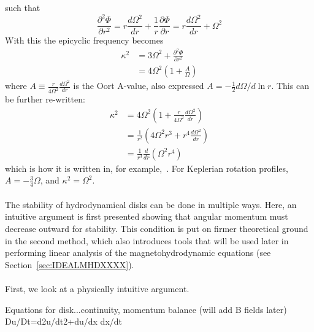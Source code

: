 such that
\begin{equation*}
\frac{\partial^2\Phi}{\partial r^2}=r\frac{d\Omega^2}{dr}+\frac1r\frac{\partial\Phi}{\partial r}=r\frac{d\Omega^2}{dr}+\Omega^2
\end{equation*}
With this the epicyclic frequency becomes
\begin{align}
\kappa^2&=3\Omega^2+\frac{\partial^2\Phi}{\partial r^2}\\
&=4\Omega^2\left(1+\frac A\Omega\right)
\end{align}
where $A\equiv \frac r{4\Omega^2}\frac{d\Omega^2}{dr}$ is the Oort A-value, also expressed $A=-\frac12 d\Omega/d\ln r$. This can be further re-written:
\begin{align*}
\kappa^2&=4\Omega^2\left(1+\frac{r}{4\Omega^2}\frac{d\Omega^2}{dr}\right)\\
&=\frac1{r^2}\left(4\Omega^2r^3+r^4\frac{d\Omega^2}{dr}\right)\\
&=\frac1{r^3}\frac{d}{dr}\left(\Omega^2r^4\right)
\end{align*}
which is how it is written in, for example,~\cite{BH1998}. For Keplerian rotation profiles, $A=-\frac34\Omega$, and $\kappa^2=\Omega^2$.\\
\\
The stability of hydrodynamical disks can be done in multiple ways. Here, an intuitive argument is first presented showing that angular momentum must decrease outward for stability. This condition is put on firmer theoretical ground in the second method, which also introduces tools that will be used later in performing linear analysis of the magnetohydrodynamic equations (see Section~\ref{sec:IDEALMHDXXXX}).  \\
\\
First, we look at a physically intuitive argument. 


Equations for disk...continuity, momentum balance (will add B fields later)
Du/Dt=d2u/dt2+du/dx dx/dt
